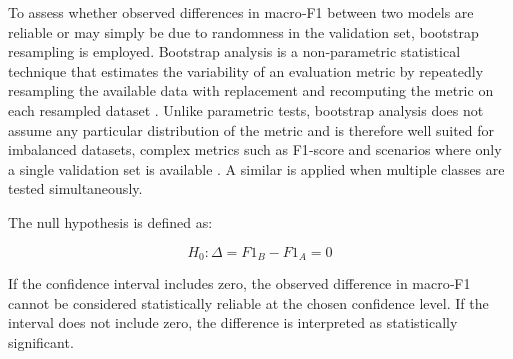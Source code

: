 To assess whether observed differences in macro‑F1 between two models are reliable or may simply be due to randomness in the validation set, bootstrap resampling is employed. Bootstrap analysis is a non‑parametric statistical technique that estimates the variability of an evaluation metric by repeatedly resampling the available data with replacement and recomputing the metric on each resampled dataset . Unlike parametric tests, bootstrap analysis does not assume any particular distribution of the metric and is therefore well suited for imbalanced datasets, complex metrics such as F1‑score and scenarios where only a single validation set is available \cite{garcia_advanced_2010, graczyk_nonparametric_2010}. A similar  is applied when multiple classes are tested simultaneously. 

The null hypothesis is defined as:

$$ H_0:
\Delta = F1_B - F1_A = 0 $$

If the confidence interval includes zero, the observed difference in macro‑F1 cannot be considered statistically reliable at the chosen confidence level. If the interval does not include zero, the difference is interpreted as statistically significant.


%
%
%
